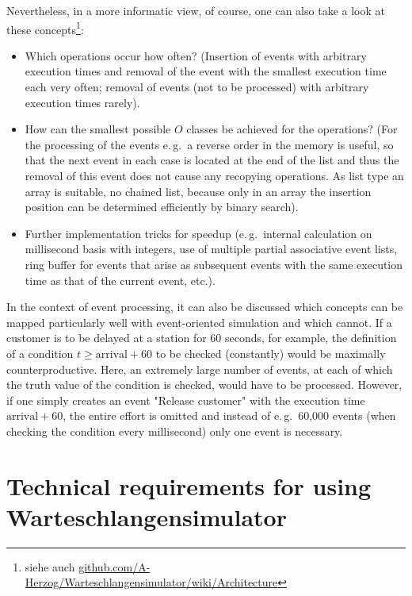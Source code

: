 \documentclass{svmono}
\begin{document}
Nevertheless, in a more informatic view, of course, one can also take a look at these concepts\footnote{siehe auch \href{https://github.com/A-Herzog/Warteschlangensimulator/wiki/Architecture}{github.com/A-Herzog/Warteschlangensimulator/wiki/Architecture}}:
\begin{itemize}
\item
Which operations occur how often? (Insertion of events with arbitrary execution times and removal of the event with the smallest execution time each very often; removal of events (not to be processed) with arbitrary execution times rarely).
\item
How can the smallest possible $O$ classes be achieved for the operations? (For the processing of the events e.\,g.\ a reverse order in the memory is useful, so that the next event in each case is located at the end of the list and thus the removal of this event does not cause any recopying operations. As list type an array is suitable, no chained list, because only in an array the insertion position can be determined efficiently by binary search).
\item
Further implementation tricks for speedup (e.\,g.\ internal calculation on millisecond basis with integers, use of multiple partial associative event lists, ring buffer for events that arise as subsequent events with the same execution time as that of the current event, etc.).
\end{itemize}

In the context of event processing, it can also be discussed which concepts can be mapped particularly well with event-oriented simulation and which cannot. If a customer is to be delayed at a station for 60 seconds, for example, the definition of a condition $t\ge\textrm{arrival}+60$ to be checked (constantly) would be maximally counterproductive. Here, an extremely large number of events, at each of which the truth value of the condition is checked, would have to be processed. However, if one simply creates an event "Release customer" with the execution time $\textrm{arrival}+60$, the entire effort is omitted and instead of e.\,g.\ 60,000 events (when checking the condition every millisecond) only one event is necessary.



\section{Technical requirements for using Warteschlangensimulator}
\end{document}
